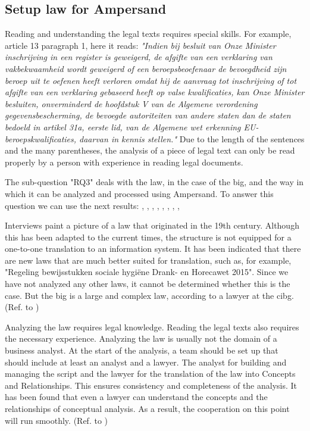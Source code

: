 \subsection{Setup law for Ampersand}\label{subsection:setup-law-for-ampersand}
Reading and understanding the legal texts requires special skills.
For example, article 13 paragraph 1, here it reads:
\textit{"Indien bij besluit van Onze Minister inschrijving in een register is geweigerd, de afgifte van een verklaring van vakbekwaamheid wordt geweigerd of een beroepsbeoefenaar de bevoegdheid zijn beroep uit te oefenen heeft verloren omdat hij de aanvraag tot inschrijving of tot afgifte van een verklaring gebaseerd heeft op valse kwalificaties, kan Onze Minister besluiten, onverminderd de hoofdstuk V van de Algemene verordening gegevensbescherming, de bevoegde autoriteiten van andere staten dan de staten bedoeld in artikel 31a, eerste lid, van de Algemene wet erkenning EU-beroepskwalificaties, daarvan in kennis stellen."}
Due to the length of the sentences and the many parentheses, the analysis of a piece of legal text can only be read properly by a person with experience in reading legal documents.

The sub-question "\acrlong{RQ3}" deals with the law, in the case of the \acrshort{big}, and the way in which it can be analyzed and processed using Ampersand.
To answer this question we can use the next results: , , , , , , , , 


Interviews paint a picture of a law that originated in the 19th century.
Although this has been adapted to the current times, the structure is not equipped for a one-to-one translation to an information system.
It has been indicated that there are new laws that are much better suited for translation, such as, for example, "Regeling bewijsstukken sociale hygiëne Drank- en Horecawet 2015".
Since we have not analyzed any other laws, it cannot be determined whether this is the case.
But the \acrshort{big} is a large and complex law, according to a lawyer at the \acrshort{cibg}.
(Ref. to )


Analyzing the law requires legal knowledge.
Reading the legal texts also requires the necessary experience.
Analyzing the law is usually not the domain of a business analyst.
At the start of the analysis, a team should be set up that should include at least an analyst and a lawyer.
The analyst for building and managing the script and the lawyer for the translation of the law into Concepts and Relationships.
This ensures consistency and completeness of the analysis.
It has been found that even a lawyer can understand the concepts and the relationships of conceptual analysis.
As a result, the cooperation on this point will run smoothly.
(Ref. to ) 


